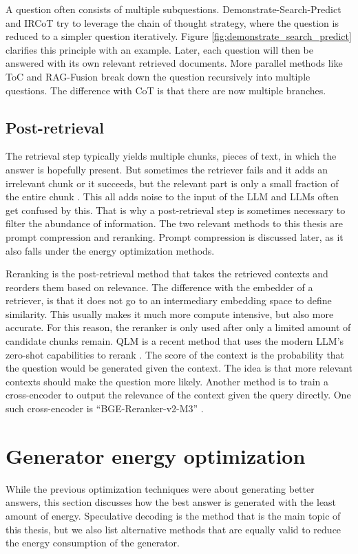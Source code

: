 A question often consists of multiple subquestions. Demonstrate-Search-Predict \cite{khattab2022demonstrate} and IRCoT \cite{trivedi2022interleaving} try to leverage the chain of thought strategy, where the question is reduced to a simpler question iteratively. Figure \ref{fig:demonstrate_search_predict} clarifies this principle with an example. Later, each question will then be answered with its own relevant retrieved documents. More parallel methods like ToC \cite{kim2023tree} and RAG-Fusion \cite{rackauckas2024ragfusion} break down the question recursively into multiple questions. The difference with CoT is that there are now multiple branches.

\subsection{Post-retrieval}
The retrieval step typically yields multiple chunks, pieces of text, in which the answer is hopefully present. But sometimes the retriever fails and it adds an irrelevant chunk or it succeeds, but the relevant part is only a small fraction of the entire chunk \cite{fan2024survey}. This all adds noise to the input of the LLM and LLMs often get confused by this. That is why a post-retrieval step is sometimes necessary to filter the abundance of information. The two relevant methods to this thesis are prompt compression and reranking. Prompt compression is discussed later, as it also falls under the energy optimization methods.

Reranking is the post-retrieval method that takes the retrieved contexts and reorders them based on relevance. The difference with the embedder of a retriever, is that it does not go to an intermediary embedding space to define similarity. This usually makes it much more compute intensive, but also more accurate. For this reason, the reranker is only used after only a limited amount of candidate chunks remain. QLM is a recent method that uses the modern LLM's zero-shot capabilities to rerank \cite{zhuang2023qlm}. The score of the context is the probability that the question would be generated given the context. The idea is that more relevant contexts should make the question more likely. Another method is to train a cross-encoder to output the relevance of the context given the query directly. One such cross-encoder is ``BGE-Reranker-v2-M3'' \cite{chen2024bge}.

\section{Generator energy optimization}
While the previous optimization techniques were about generating better answers, this section discusses how the best answer is generated with the least amount of energy. Speculative decoding is the method that is the main topic of this thesis, but we also list alternative methods that are equally valid to reduce the energy consumption of the generator.

